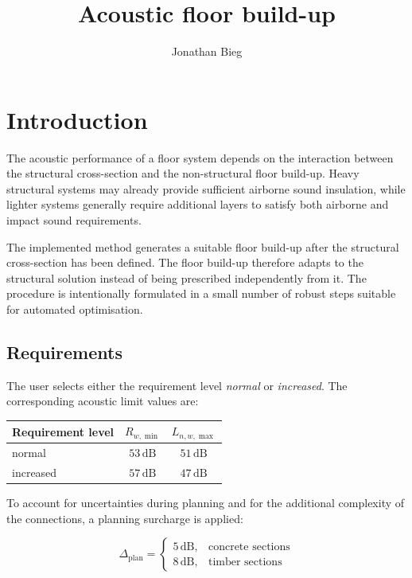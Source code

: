 \documentclass[9pt,a4paper,twocolumn,twoside]{rho-class/rho}
\title{Acoustic floor build-up}
\author[{\textasteriskcentered},a,1]{Jonathan Bieg}
\affil[a]{jobieg@ethz.ch}
\begin{document}
    \maketitle
    \thispagestyle{firststyle}

\section{Introduction}

The acoustic performance of a floor system depends on the interaction between the structural cross-section and the non-structural floor build-up. Heavy structural systems may already provide sufficient airborne sound insulation, while lighter systems generally require additional layers to satisfy both airborne and impact sound requirements.

\noindent The implemented method generates a suitable floor build-up after the structural cross-section has been defined. The floor build-up therefore adapts to the structural solution instead of being prescribed independently from it. The procedure is intentionally formulated in a small number of robust steps suitable for automated optimisation.

\subsection{Requirements}

The user selects either the requirement level \textit{normal} or \textit{increased}. The corresponding acoustic limit values are:

\begin{table}[H]
\begin{tabular}{l|cc}
    Requirement level & $R_{w,\min}$ & $L_{n,w,\max}$ \\ \hline
    normal & $53\,\mathrm{dB}$ & $51\,\mathrm{dB}$ \\
    increased & $57\,\mathrm{dB}$ & $47\,\mathrm{dB}$
\end{tabular}
\end{table}

\noindent To account for uncertainties during planning and for the additional complexity of the connections, a planning surcharge is applied:

\[
    \Delta_{\mathrm{plan}}=
    \begin{cases}
        5\,\mathrm{dB}, & \text{concrete sections} \\
        8\,\mathrm{dB}, & \text{timber sections}
    \end{cases}
\]
\end{document}
